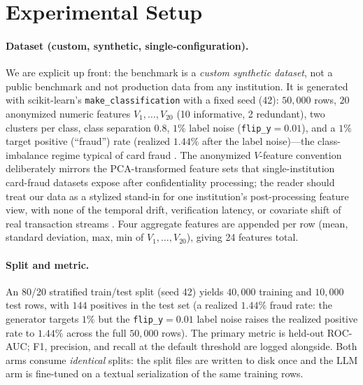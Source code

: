 \section{Experimental Setup}
\label{sec:p8-setup}

\paragraph{Dataset (custom, synthetic, single-configuration).}
We are explicit up front: the benchmark is a \emph{custom synthetic dataset},
not a public benchmark and not production data from any institution. It is
generated with scikit-learn's \texttt{make\_classification}
\citep{pedregosa2011sklearn} with a fixed seed (42): $50{,}000$ rows, $20$
anonymized numeric features $V_1,\dots,V_{20}$ (10 informative, 2 redundant),
two clusters per class, class separation $0.8$, $1\%$ label noise
(\texttt{flip\_y}$=0.01$), and a $1\%$ target positive (``fraud'') rate
(realized $1.44\%$ after the label noise)---the
class-imbalance regime typical of card fraud \citep{dalpozzolo2018realistic}.
The anonymized $V$-feature convention deliberately mirrors the PCA-transformed
feature sets that single-institution card-fraud datasets expose after
confidentiality processing; the reader should treat our data as a stylized
stand-in for one institution's post-processing feature view, with none of the
temporal drift, verification latency, or covariate shift of real transaction
streams \citep{dalpozzolo2018realistic}. Four aggregate features are appended
per row (mean, standard deviation, max, min of $V_1,\dots,V_{20}$), giving 24
features total.

\paragraph{Split and metric.}
An 80/20 stratified train/test split (seed 42) yields $40{,}000$ training and
$10{,}000$ test rows, with $144$ positives in the test set (a realized
$1.44\%$ fraud rate: the generator targets $1\%$ but the
\texttt{flip\_y}$=0.01$ label noise raises the realized positive rate to
$1.44\%$ across the full $50{,}000$ rows). The primary
metric is held-out ROC-AUC; F1, precision, and recall at the default threshold
are logged alongside. Both arms consume \emph{identical} splits: the split
files are written to disk once and the LLM arm is fine-tuned on a textual
serialization of the same training rows.

